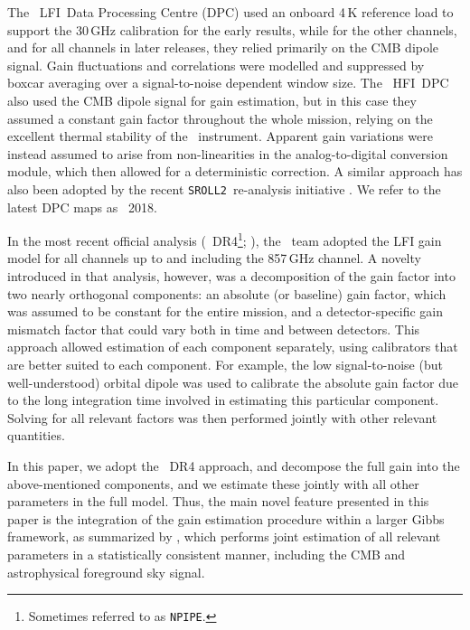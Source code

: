 \documentclass[twocolumn]{aa}
\newcommand{\lfi}[0]{LFI}
\newcommand{\hfi}[0]{HFI}
\newcommand{\npipe}[0]{\texttt{NPIPE}}
\newcommand{\srollTwo}[0]{\texttt{SROLL2}}
\begin{document}
The \Planck\ \lfi\ Data Processing Centre (DPC) \citep{planck2013-p02,planck2014-a06,planck2016-l02} used an onboard 4\,K reference load to support the 30\,GHz calibration for the early results, while for the other channels, and for all channels in later releases, they relied primarily on the CMB dipole signal. Gain fluctuations and correlations were modelled and suppressed by boxcar averaging over a signal-to-noise dependent window size. The \Planck\ \hfi\ DPC \citep{planck2013-p03f,planck2014-a09,planck2016-l03} also used the CMB dipole signal for gain estimation, but in this case they assumed a constant gain factor throughout the whole mission, relying on the excellent thermal stability of the \Planck\ instrument. Apparent gain variations were instead assumed to arise from non-linearities in the analog-to-digital conversion module, which then allowed for a deterministic correction. A similar approach has also been adopted by the recent \srollTwo\ re-analysis initiative \citep{delouis:2019}. We refer to the latest DPC maps as \Planck\ 2018.

In the most recent official analysis (\Planck\ DR4\footnote{Sometimes referred to as \npipe.}; \citealp{planck2020-LVII}), the \Planck\ team adopted the LFI gain model for all channels up to and including the 857\,GHz channel. A novelty introduced in that analysis, however, was a decomposition of the gain factor into two nearly orthogonal components: an absolute (or baseline) gain factor, which was assumed to be constant for the entire mission, and a detector-specific gain mismatch factor that could vary both in time and between detectors. This approach allowed estimation of each component separately, using calibrators that are better suited to each component. For example, the low signal-to-noise (but well-understood) orbital dipole was used to calibrate the absolute gain factor due to the long integration time involved in estimating this particular component. Solving for all relevant factors was then performed jointly with other relevant quantities.

In this paper, we adopt the \Planck\ DR4 approach, and decompose the full gain into the above-mentioned components, and we estimate these jointly with all other parameters in the full model. Thus, the main novel feature presented in this paper is the integration of the gain estimation procedure within a larger Gibbs framework, as summarized by \citet{bp01}, which performs joint estimation of all relevant parameters in a statistically consistent manner, including the CMB and astrophysical foreground sky signal.
\end{document}
